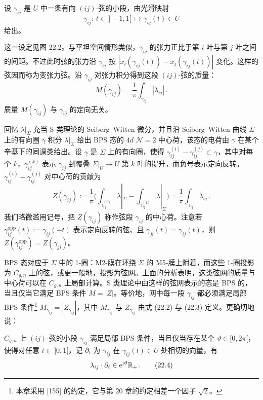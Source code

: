 
设 $\gamma_{ij}$ 是 $U$ 中一条有向 $(ij)$-弦的小段，由光滑映射
\[
\gamma_{ij}:\ t\in\,]-1,1[\,\longmapsto \gamma_{ij}(t)\in U
\]
给出。

这一设定见图 22.2。与平坦空间情形类似，$\gamma_{ij}$ 的张力正比于第 $i$ 叶与第 $j$ 叶之间的间距。不过此时弦的张力沿 $\gamma_{ij}$ 按 $|x_i(\gamma_{ij}(t))-x_j(\gamma_{ij}(t))|$ 变化。这样的弦因而称为变张力弦。沿 $\gamma_{ij}$ 对张力积分得到这段 $(ij)$-弦的质量：
\begin{equation}
M(\gamma_{ij})=\frac{1}{\pi}\int_{\gamma_{ij}}|\lambda_{ij}|\,.\tag{22.2}
\end{equation}
质量 $M(\gamma_{ij})$ 与 $\gamma_{ij}$ 的定向无关。

回忆 $\lambda|_{\Sigma}$ 充当 S 类理论的 Seiberg–Witten 微分，并且沿 Seiberg–Witten 曲线 $\Sigma$ 上的有向圈 $\gamma$ 积分 $\lambda|_{\Sigma}$ 给出 BPS 态的 $4d$ $\mathcal{N}=2$ 中心荷，该态的电荷由 $\gamma$ 在某个辛基下的同调类给出。设 $\gamma$ 是 $\Sigma$ 上的有向圈，使得 $\gamma^{(i)}_{ij}-\gamma^{(j)}_{ij}\subset\gamma$，其中对每个 $k$，$\gamma^{(k)}_{ij}$ 表示 $\gamma_{ij}$ 到覆叠 $\Sigma|_U\to U$ 第 $k$ 叶的提升，而负号表示定向反转。$\gamma^{(i)}_{ij}-\gamma^{(j)}_{ij}$ 对中心荷的贡献为
\begin{equation}
Z(\gamma_{ij}):=\frac{1}{\pi}\bigg(\int_{\gamma^{(i)}_{ij}}\lambda|_{\Sigma}-\int_{\gamma^{(j)}_{ij}}\lambda|_{\Sigma}\bigg)=\frac{1}{\pi}\int_{\gamma_{ij}}\lambda_{ij}\,.\tag{22.3}
\end{equation}
我们略微滥用记号，把 $Z(\gamma_{ij})$ 称作弦段 $\gamma_{ij}$ 的中心荷。注意若 $\gamma^{\mathrm{opp}}_{ij}(t):=\gamma_{ij}(-t)$ 表示定向反转的弦、且 $\gamma_{ji}(t)=\gamma_{ij}(t)$，则 $Z(\gamma^{\mathrm{opp}}_{ij})=Z(\gamma_{ji})$。

BPS 态对应于 $\Sigma$ 中的 1-圈：M2-膜在环绕 $\Sigma$ 的 M5-膜上附着，而这些 1-圈投影为 $C_{g,n}$ 上的弦，或更一般地，投影为弦网。上面的分析表明，这类弦网的质量与中心荷可以在 $C_{g,n}$ 上局部计算。S 类理论中由这样的弦网表示的态是 BPS 的，当且仅当它满足 BPS 条件 $M=|Z|$。等价地，网中每一段 $\gamma_{ij}$ 都必须满足局部 BPS 条件\footnote{本章采用 [155] 的约定，它与第 20 章的约定相差一个因子 $\sqrt{2}$。} $M_{\gamma_{ij}}=|Z_{\gamma_{ij}}|$，其中 $M_{\gamma_{ij}}$ 与 $Z_{\gamma_{ij}}$ 由式 (22.2) 与 (22.3) 定义。更确切地说：

\begin{definition}[22.1]
$C_{g,n}$ 上 $(ij)$-弦的小段 $\gamma_{ij}$ 满足局部 BPS 条件，当且仅当存在某个 $\vartheta\in[0,2\pi[$，使得对任意 $t\in\,]0,1[$，记 $\partial_t$ 为 $\gamma_{ij}$ 在 $\gamma_{ij}(t)\in U$ 处相切的向量，有
\begin{equation}
\lambda_{ij}\cdot\partial_t\in \mathrm{e}^{\mathrm{i}\vartheta}\mathbb{R}_+\,.\tag{22.4}
\end{equation}
\end{definition}

